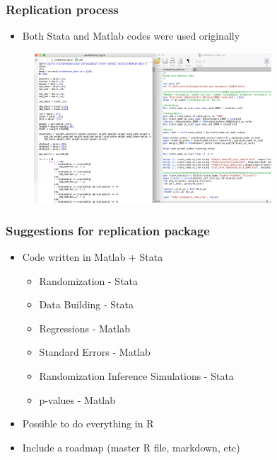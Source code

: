 \documentclass{beamer}
\begin{document}
\begin{frame}
\frametitle{Replication process}


\begin{itemize}
\item Both Stata and Matlab codes were used originally
\end{itemize}

\begin{figure}[htbp]
\centering \includegraphics[width=3.5in]{../Figures/statamatlab}
\end{figure}


\end{frame}




\begin{frame}
\frametitle{Suggestions for replication package}

\begin{itemize}
\item Code written in Matlab + Stata
\begin{itemize}
\item Randomization - Stata
\item Data Building - Stata
\item Regressions - Matlab
\item Standard Errors - Matlab
\item Randomization Inference Simulations - Stata
\item p-values - Matlab
\end{itemize}
\item Possible to do everything in R
\item Include a roadmap (master R file, markdown, etc)
\end{itemize}

\end{frame}
\end{document}
